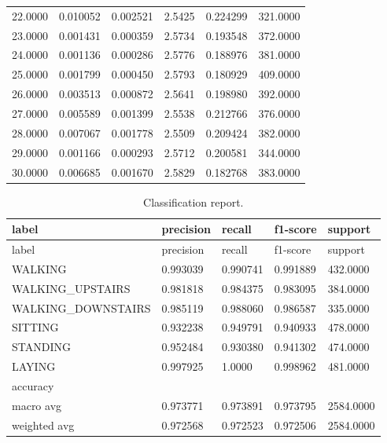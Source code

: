 \documentclass[11pt]{report}
\begin{document}
\begin{longtable}{llllll}
22.0000 & 0.010052 & 0.002521 & 2.5425 & 0.224299 & 321.0000 \\
23.0000 & 0.001431 & 0.000359 & 2.5734 & 0.193548 & 372.0000 \\
24.0000 & 0.001136 & 0.000286 & 2.5776 & 0.188976 & 381.0000 \\
25.0000 & 0.001799 & 0.000450 & 2.5793 & 0.180929 & 409.0000 \\
26.0000 & 0.003513 & 0.000872 & 2.5641 & 0.198980 & 392.0000 \\
27.0000 & 0.005589 & 0.001399 & 2.5538 & 0.212766 & 376.0000 \\
28.0000 & 0.007067 & 0.001778 & 2.5509 & 0.209424 & 382.0000 \\
29.0000 & 0.001166 & 0.000293 & 2.5712 & 0.200581 & 344.0000 \\
30.0000 & 0.006685 & 0.001670 & 2.5829 & 0.182768 & 383.0000 \\
\bottomrule
\end{longtable}
\begin{longtable}{lllll}
\caption{Classification report.}\\
\toprule
label & precision & recall & f1-score & support \\
\midrule
\endfirsthead
\toprule
label & precision & recall & f1-score & support \\
\midrule
\endhead
WALKING & 0.993039 & 0.990741 & 0.991889 & 432.0000 \\
WALKING\_UPSTAIRS & 0.981818 & 0.984375 & 0.983095 & 384.0000 \\
WALKING\_DOWNSTAIRS & 0.985119 & 0.988060 & 0.986587 & 335.0000 \\
SITTING & 0.932238 & 0.949791 & 0.940933 & 478.0000 \\
STANDING & 0.952484 & 0.930380 & 0.941302 & 474.0000 \\
LAYING & 0.997925 & 1.0000 & 0.998962 & 481.0000 \\
accuracy &  &  &  &  \\
macro avg & 0.973771 & 0.973891 & 0.973795 & 2584.0000 \\
weighted avg & 0.972568 & 0.972523 & 0.972506 & 2584.0000 \\
\bottomrule
\end{longtable}
\end{document}
